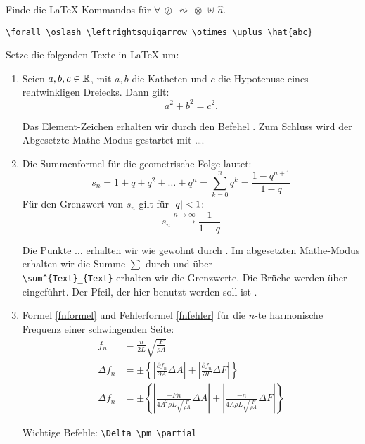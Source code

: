 \item Finde die \LaTeX{} Kommandos für $\forall\,\oslash\,\leftrightsquigarrow\,\otimes\,\uplus\,\hat{a}$.
    \begin{loesung}
        \verb|\forall \oslash \leftrightsquigarrow \otimes \uplus \hat{abc}|
    \end{loesung}

    
\item Setze die folgenden Texte in \LaTeX{} um:
    \begin{enumerate}
        \item Seien $a,b,c\in\mathbb{R}$, mit $a,b$ die Katheten und $c$ die Hypotenuse
            eines rehtwinkligen Dreiecks. Dann gilt: 
            \[
                a^2+b^2=c^2.
            \]
            \begin{loesung}
                Das Element-Zeichen erhalten wir durch den Befehel . Zum Schluss
                wird der Abgesetzte Mathe-Modus gestartet mit \cmd{[} \dots \cmd{]}.
            \end{loesung}


            \item Die Summenformel für die geometrische Folge lautet:
            \[
                s_n = 1+ q+q^2+\dots+q^n = \sum_{k=0}^{n}q^k = \frac{1-q^{n+1}}{1-q}
            \]
            Für den Grenzwert von $s_n$ gilt für $\lvert q\rvert<1$: 
            \[
                s_n\xrightarrow{n\rightarrow\infty} \frac{1}{1-q}
            \]
            \begin{loesung}
                Die Punkte $\dots$ erhalten wir wie gewohnt durch . Im
                abgesetzten Mathe-Modus erhalten wir die Summe $\sum$ durch 
                und über \\ \verb|\sum^{Text}_{Text}| erhalten wir die Grenzwerte.
                Die Brüche werden über  eingeführt.
                Der Pfeil, der hier benutzt werden soll ist .
            \end{loesung}
        \item Formel \eqref{fnformel} und Fehlerformel \eqref{fnfehler} für die
            $n$-te harmonische Frequenz einer schwingenden Seite:
            \begin{align}
		        f_n &= \frac{n}{2L} \sqrt{\frac{F}{\rho A}}\label{fnformel}\\
		        \Delta f_n &= \pm \left\lbrace 
		            \left| \frac{\partial f_n}{\partial A} \Delta A \right| +
		            \left| \frac{\partial f_n}{\partial F} \Delta F \right|
		            \right\rbrace \label{fnfunction}\\
		        \Delta f_n &= \pm \left\lbrace
		            \left| \frac{-F n}{4 A^2 \rho L \sqrt{\frac{F}{\rho A}}}
		                \Delta A \right| + 
		            \left| \frac{-n}{4 A \rho L \sqrt{\frac{F}{\rho A}}}
		                \Delta F \right|
		            \right\rbrace \label{fnfehler}
            \end{align}
            \begin{loesung}
                Wichtige Befehle: \verb|\Delta \pm \partial|
            \end{loesung}
            

\end{enumerate}
